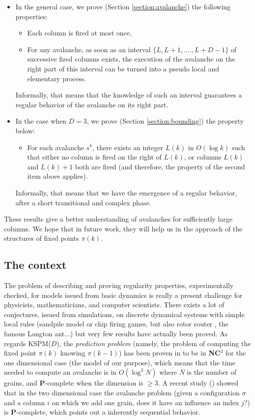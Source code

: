 \documentclass[11pt,a4paper]{llncs}
\begin{document}
 \begin{itemize}
\item In the general case, we prove (Section \ref{section:avalanche}) the following properties:  
 \begin{itemize}
\item Each column is fired at most once, 
\item For any avalanche, as soon as an interval  $\{ L, L+1, ...., L+D-1 \} $ of successive fired columns exists, the execution of the avalanche on the right part of this interval can be turned into a pseudo local  and elementary process. 

\end{itemize}
Informally, that means that the knowledge of such an interval guarantees a regular behavior  of the avalanche on its right part. 

\item  In the case when $D = 3$,  we prove (Section \ref{section:bounding}) the property below: 
\begin{itemize}
\item For each avalanche $s^k$, there  exists an integer  $L(k)$ in $O(\log{k})$ such that either no column is fired on the right of $L(k)$,  or  columns $L(k)$ and $L(k) +1$ both are fired (and therefore, the property of the second item above applies). 
\end{itemize}
Informally, that means that we have the emergence of  a regular behavior, after a short transitional and complex phase. 
\end{itemize}

These results give a better understanding of avalanches for sufficiently large columns. We hope that in future work, they will help us in the  approach of the structures of fixed points $\pi(k)$. 

\subsection{The context}

 The problem of describing and proving regularity properties, experimentally checked,  for   models issued from  basic dynamics is really a present challenge for physicists, mathematicians, and computer scientists. There exists
a lot of conjectures, issued from simulations, on  discrete dynamical systems with simple local rules (sandpile model \cite{dartois} or chip firing games, but also  rotor router  \cite{levine},  the famous Langton ant\cite{gajardo}\cite{propp}...)  but very few results have actually been proved. As regards KSPM($D$), the {\em prediction problem} (namely, the problem of computing the fixed point $\pi(k)$ knowing $\pi(k-1)$) has been proven in \cite{moore99} to be in \textbf{NC}$^3$ for the one dimensional case (the model of our purpose), which means that the time needed to compute an avalanche is in $O(\log^3 N)$ where $N$ is the number of grains, and \textbf{P}-complete when the dimension is $\geq 3$.  A recent study (\cite{goles10}) showed that in the two dimensional case the avalanche problem (given a configuration $\sigma$ and a column $i$ on which we add one grain, does it have an influence an index $j$?) is \textbf{P}-complete, which points out a inherently sequential behavior.
\end{document}
